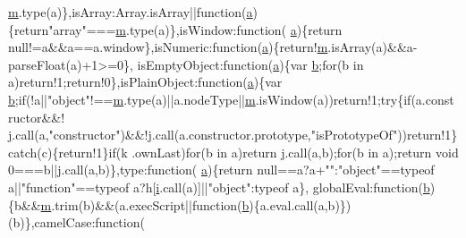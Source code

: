 \begin{DoxyCode}
      \hyperlink{a00039_af6e3698b7f50fc004eb759d7c447fdb3}{m}.type(a)\},isArray:Array.isArray||\textcolor{keyword}{function}(\hyperlink{a00030_aa4d4888597588a84fd5b1184d00c91f3}{a})\{\textcolor{keywordflow}{return}\textcolor{stringliteral}{"array"}===\hyperlink{a00039_af6e3698b7f50fc004eb759d7c447fdb3}{m}.type(a)\},isWindow:\textcolor{keyword}{function}(
      \hyperlink{a00030_aa4d4888597588a84fd5b1184d00c91f3}{a})\{\textcolor{keywordflow}{return} null!=a&&a==a.window\},isNumeric:\textcolor{keyword}{function}(\hyperlink{a00030_aa4d4888597588a84fd5b1184d00c91f3}{a})\{\textcolor{keywordflow}{return}!\hyperlink{a00039_af6e3698b7f50fc004eb759d7c447fdb3}{m}.isArray(a)&&a-parseFloat(a)+1>=0\},
      isEmptyObject:\textcolor{keyword}{function}(\hyperlink{a00030_aa4d4888597588a84fd5b1184d00c91f3}{a})\{var \hyperlink{a00030_ac0431efac4d7c393d1e70b86115cb93f}{b};\textcolor{keywordflow}{for}(b in a)\textcolor{keywordflow}{return}!1;\textcolor{keywordflow}{return}!0\},isPlainObject:\textcolor{keyword}{function}(\hyperlink{a00030_aa4d4888597588a84fd5b1184d00c91f3}{a})\{var 
      \hyperlink{a00030_ac0431efac4d7c393d1e70b86115cb93f}{b};\textcolor{keywordflow}{if}(!a||\textcolor{stringliteral}{"object"}!==\hyperlink{a00039_af6e3698b7f50fc004eb759d7c447fdb3}{m}.type(a)||a.nodeType||\hyperlink{a00039_af6e3698b7f50fc004eb759d7c447fdb3}{m}.isWindow(a))\textcolor{keywordflow}{return}!1;\textcolor{keywordflow}{try}\{\textcolor{keywordflow}{if}(a.constructor&&!
      \hyperlink{a00007_abf2bc2545a4a5f5683d9ef3ed0d977e0}{j}.call(a,\textcolor{stringliteral}{"constructor"})&&!\hyperlink{a00007_abf2bc2545a4a5f5683d9ef3ed0d977e0}{j}.call(a.constructor.prototype,\textcolor{stringliteral}{"isPrototypeOf"}))\textcolor{keywordflow}{return}!1\}\textcolor{keywordflow}{catch}(c)\{\textcolor{keywordflow}{return}!1\}\textcolor{keywordflow}{if}(k
      .ownLast)\textcolor{keywordflow}{for}(b in a)\textcolor{keywordflow}{return} \hyperlink{a00007_abf2bc2545a4a5f5683d9ef3ed0d977e0}{j}.call(a,b);\textcolor{keywordflow}{for}(b in a);\textcolor{keywordflow}{return} \textcolor{keywordtype}{void} 0===b||\hyperlink{a00007_abf2bc2545a4a5f5683d9ef3ed0d977e0}{j}.call(a,b)\},type:\textcolor{keyword}{function}(
      \hyperlink{a00030_aa4d4888597588a84fd5b1184d00c91f3}{a})\{\textcolor{keywordflow}{return} null==a?a+\textcolor{stringliteral}{""}:\textcolor{stringliteral}{"object"}==typeof a||\textcolor{stringliteral}{"function"}==typeof a?h[\hyperlink{a00005_a6dbbc96f4222af2f6c18c8e60f41726b}{i}.call(a)]||\textcolor{stringliteral}{"object"}:typeof a\},
      globalEval:\textcolor{keyword}{function}(\hyperlink{a00030_ac0431efac4d7c393d1e70b86115cb93f}{b})\{b&&\hyperlink{a00039_af6e3698b7f50fc004eb759d7c447fdb3}{m}.trim(b)&&(a.execScript||\textcolor{keyword}{function}(\hyperlink{a00030_ac0431efac4d7c393d1e70b86115cb93f}{b})\{a.eval.call(a,b)\})(b)\},camelCase:\textcolor{keyword}{function}(

\end{DoxyCode}
